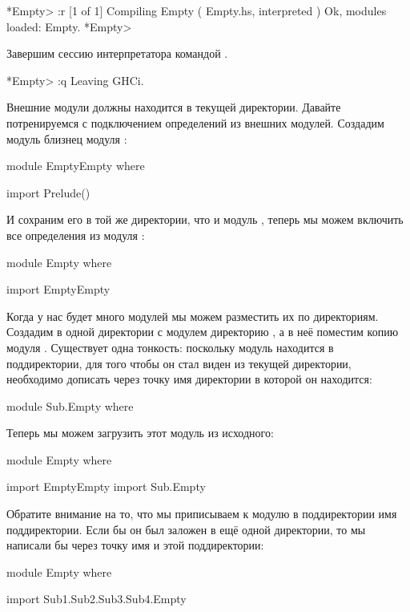 \begin{code}
*Empty> :r
[1 of 1] Compiling Empty            ( Empty.hs, interpreted )
Ok, modules loaded: Empty.
*Empty>
\end{code}

Завершим сессию интерпретатора командой .


\begin{code}
*Empty> :q
Leaving GHCi.
\end{code}

Внешние модули должны находится в текущей директории. Давайте
потренируемся с подключением определений из внешних модулей. Создадим
модуль близнец модуля :


\begin{code}
module EmptyEmpty where

import Prelude()
\end{code}

И сохраним его в той же директории, что и модуль , теперь мы
можем включить все определения из модуля :


\begin{code}
module Empty where

import EmptyEmpty
\end{code}

Когда у нас будет много модулей мы можем разместить их по директориям.
Создадим в одной директории с модулем  директорию , а
в неё поместим копию модуля . Существует одна тонкость:
поскольку модуль находится в поддиректории, для того чтобы он стал виден
из текущей директории, необходимо дописать через точку имя директории в
которой он находится:


\begin{code}
module Sub.Empty where
\end{code}

Теперь мы можем загрузить этот модуль из исходного:


\begin{code}
module Empty where

import EmptyEmpty
import Sub.Empty
\end{code}

Обратите внимание на то, что мы приписываем к модулю в поддиректории
 имя поддиректории. Если бы он был заложен в ещё одной
директории, то мы написали бы через точку имя и этой поддиректории:


\begin{code}
module Empty where

import Sub1.Sub2.Sub3.Sub4.Empty
\end{code}

